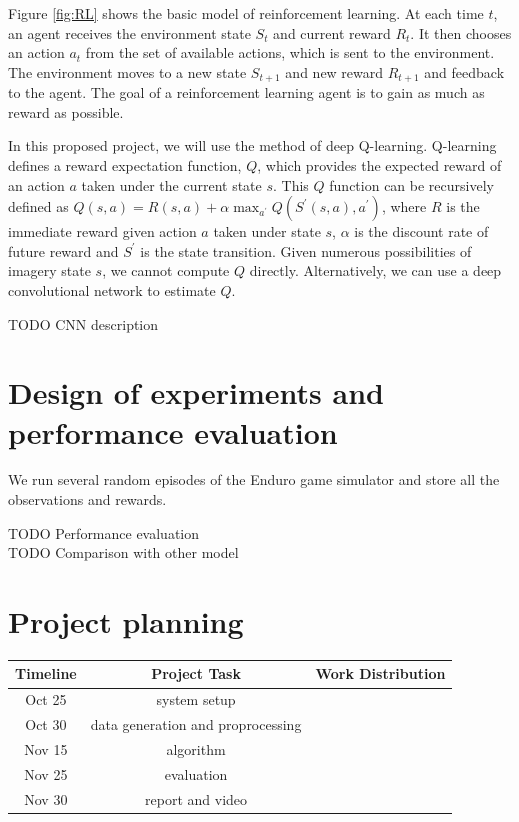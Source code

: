 \documentclass[a4paper]{article}
\begin{document}
Figure \ref{fig:RL} shows the basic model of reinforcement learning. At each time $t$, an agent
receives the environment state $S_t$ and current reward $R_t$. It then chooses an action $a_t$
from the set of available actions, which is sent to the environment. The environment moves
to a new state $S_{t+1}$ and new reward $R_{t+1}$ and feedback to the agent. The goal of a
reinforcement learning agent is to gain as much as reward as possible.


In this proposed project, we will use the method of deep Q-learning. Q-learning defines a reward
expectation function, $Q$, which provides the expected reward of an action $a$ taken under the
current state $s$. This $Q$ function can be recursively defined as $Q(s,a) = R(s,a) + \alpha
\max_{a^{'}} Q(S^{'}(s,a),a^{'})$, where $R$ is the immediate reward given action $a$ taken under
state $s$, $\alpha$ is the discount rate of future reward and $S^{'}$ is the state transition.
Given numerous possibilities of imagery state $s$, we cannot compute $Q$ directly. Alternatively,
we can use a deep convolutional network to estimate $Q$.

TODO CNN description\\

\section{Design of experiments and performance evaluation}

We run several random episodes of the Enduro game simulator and store all the observations and rewards.

TODO Performance evaluation\\
TODO Comparison with other model\\

\section {Project planning}

\begin{center}
    \begin{tabular}{ | c | c | c | } 
        \hline
        Timeline & Project Task & Work Distribution   \\ 
        \hline
        Oct 25   & system setup &   \\ 
        \hline
        Oct 30   & data generation and proprocessing &   \\ 
        \hline
        Nov 15   & algorithm  &   \\ 
        \hline
        Nov 25   & evaluation  &   \\ 
        \hline
        Nov 30   & report and video  &   \\ 
        \hline
    \end{tabular}
\end{center}
\end{document}
